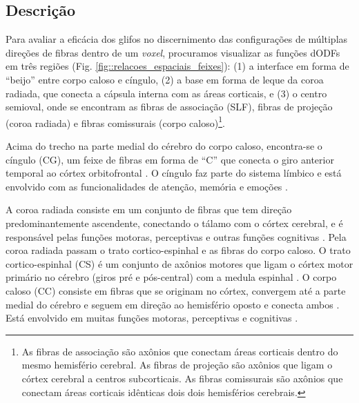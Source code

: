
\subsection{Descrição}

Para avaliar a eficácia dos glifos no discernimento das configurações de múltiplas direções de fibras dentro de um \textit{voxel}, procuramos visualizar as funções dODFs em três regiões (Fig. \ref{fig::relacoes_espaciais_feixes}): (1) a interface em forma de ``beijo'' entre corpo caloso e cíngulo, (2) a base em forma de leque da coroa radiada, que conecta a cápsula interna com as áreas corticais,  e (3) o centro semioval, onde se encontram as fibras de associação (SLF), fibras de projeção (coroa radiada) e fibras comissurais (corpo caloso)\footnote{As fibras de associação são axônios que conectam áreas corticais dentro do mesmo hemisfério cerebral. As fibras de projeção são axônios que ligam o córtex cerebral a centros subcorticais. As fibras comissurais são axônios que conectam áreas corticais idênticas dois dois hemisférios cerebrais.}. 

Acima do trecho na parte medial do cérebro do corpo caloso, encontra-se o cíngulo (CG), um feixe de fibras em forma de ``C'' que conecta o giro anterior temporal ao córtex orbitofrontal \cite{fortin2012}. O cíngulo faz parte do sistema límbico e está envolvido com as funcionalidades de atenção, memória e emoções \cite{catani2008}.

A coroa radiada consiste em um conjunto de fibras que tem direção predominantemente ascendente, conectando o tálamo com o córtex cerebral, e é responsável pelas funções motoras, perceptivas e outras funções cognitivas \cite{catani2008}. Pela coroa radiada passam o trato cortico-espinhal e as fibras do corpo caloso. O trato cortico-espinhal (CS) é um conjunto de axônios motores que ligam o córtex motor primário no cérebro (giros pré e pós-central) com a medula espinhal \cite{DTI_Handbook}. O corpo caloso (CC) consiste em fibras que se originam no córtex, convergem até a parte medial do cérebro e seguem em direção ao hemisfério oposto e conecta ambos \cite{fortin2012}. Está envolvido em muitas funções motoras, perceptivas e cognitivas \cite{catani2008}. 



